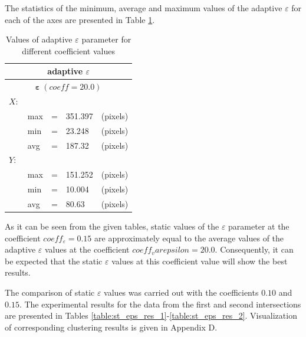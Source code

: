 The statistics of the minimum, average and maximum values of the adaptive $\varepsilon$ for each of the axes are presented in Table \ref{table:eps_adapt}.

\begin{table}[!htb]
	\caption{Values of adaptive $\varepsilon$ parameter for different coefficient values}
	\label{table:eps_adapt}
	
	\setlength{\tabcolsep}{10pt}
	\centering
	
	\begin{tabular}{||lllll||}
		\multicolumn{5}{c}{adaptive $\varepsilon$} \\
		\hline
		\multicolumn{5}{||c||}{$\bm{\varepsilon}\ (coeff = 20.0)$}\\
		$X:$       			& & & & \\[0.5ex]
		& max 	& = 	& 351.397 	& (pixels) \\[0.5ex]
		& min 	& = 	& 23.248 	& (pixels) \\[0.5ex]
		& avg 	& = 	& 187.32 	& (pixels) \\[0.5ex]
		$Y:$       			& & & & \\[0.5ex]
		& max 	& = 	& 151.252 	& (pixels) \\[0.5ex]
		& min 	& = 	& 10.004 	& (pixels) \\[0.5ex]
		& avg 	& = 	& 80.63 	& (pixels) \\[0.5ex]
		\hline
	\end{tabular}
\end{table}

As it can be seen from the given tables, static values of the $\varepsilon$ parameter at the coefficient $coeff_\varepsilon = 0.15$ are approximately equal to the average values of the adaptive $\varepsilon$ values at the coefficient $coeff_varepsilon = 20.0$. Consequently, it can be expected that the static $\varepsilon$ values ​​at this coefficient value will show the best results.

The comparison of static $\varepsilon$ values was carried out with the coefficients $0.10$ and $0.15$. The experimental results for the data from the first and second intersections are presented in Tables \ref{table:st_eps_res_1}-\ref{table:st_eps_res_2}. Visualization of corresponding clustering results is given in Appendix D.

